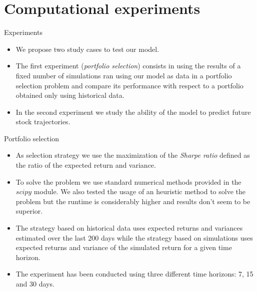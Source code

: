 \documentclass{beamer}
\begin{document}
	\section{Computational experiments}
		\begin{frame}{Experiments}
		\begin{itemize}
			\item We propose two study cases to test our model. 
			\item The first experiment (\textit{portfolio selection}) consists in using the results of a fixed number of simulations ran using our model as data in a portfolio selection 
				  problem and compare its performance with respect to a portfolio obtained only using historical data.
	    	\item In the second experiment we study the ability of the model to predict future stock trajectories.
		\end{itemize}	
		\end{frame}

		\begin{frame}{Portfolio selection}
		\begin{itemize}
			\item As selection strategy we use the maximization of the \textit{Sharpe ratio} defined as the ratio of the expected return and variance.
			\item To solve the problem we use standard numerical methods provided in the $scipy$ module. We also tested the usage of an heuristic method to solve the problem but the runtime is
		          considerably higher and results don't seem to be superior.
			\item The strategy based on historical data uses expected returns and variances estimated over the last 200 days while the strategy based on simulations uses expected returns and
			  	  variance of the simulated return for a given time horizon.
			\item The experiment has been conducted using three different time horizons: 7, 15 and 30 days.
		\end{itemize}
		\end{frame}
	
\end{document}
